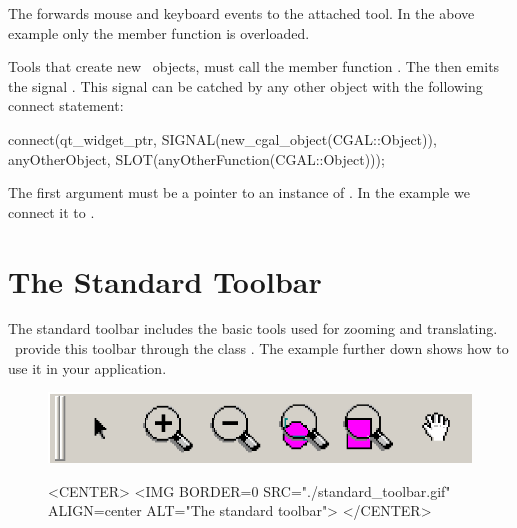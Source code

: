 The  forwards mouse and keyboard events to the attached tool.
In the above example only the  member function is overloaded.

Tools that create new \cgal\ objects, must call the member 
function . The  
then emits the signal . This signal can be 
catched by any other object with the following connect statement:


\begin{ccExampleCode}
connect(qt_widget_ptr, SIGNAL(new_cgal_object(CGAL::Object)), 
        anyOtherObject, SLOT(anyOtherFunction(CGAL::Object)));
\end{ccExampleCode}

The first argument must be a pointer to an instance of .
In the example we connect it to .

\section{The Standard Toolbar}
\label{Qt_widget_standard_toolbar}

The standard toolbar includes the basic tools used for zooming and
translating. \cgal\ provide this toolbar through the class
. The example further down shows
how to use it in your application.

\begin{figure}
\begin{ccTexOnly}
\begin{center}
\includegraphics{standard_toolbar.eps} 
\end{center}
\end{ccTexOnly}
\begin{ccHtmlOnly}
<CENTER>
<IMG BORDER=0 SRC="./standard_toolbar.gif"  ALIGN=center  ALT="The
standard toolbar">
</CENTER>
\end{ccHtmlOnly}
\end{figure}

